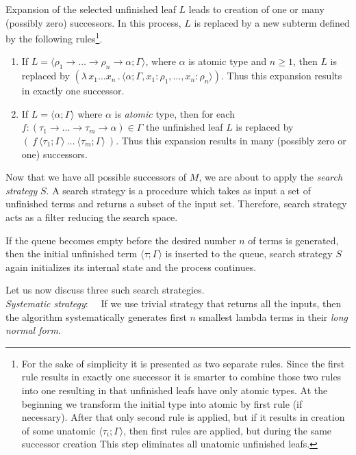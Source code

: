 \documentclass[conference]{IEEEtran}
\newcommand{\Lets}{Let us\xspace}
\newcommand{\lamb}[2]{( \lambda \, #1 \, . \, #2 )}
\newcommand{\ar}{\rightarrow\xspace}
\newcommand{\ul}[2]{\langle #1 ; #2 \rangle}
\begin{document}
Expansion of the selected unfinished leaf $L$ leads to creation of 
one or many (possibly zero) successors.
In this process, $L$ is replaced
by a new subterm defined by the following rules\footnote{
For the sake of simplicity it is presented as two separate rules. 
Since the first rule results in exactly one successor it is smarter
to combine those two rules into one resulting in that unfinished leafs
have only atomic types. At the beginning we transform the initial type into atomic by first rule (if necessary). After that
only second rule is applied, but if it results in creation of some unatomic 
$\ul{\tau_i}{\Gamma}$, then first rules are applied, but during the same successor creation This step eliminates all unatomic unfinished leafs. }.
\begin{enumerate}
 \item If $L = \ul{\rho_1 \ar \dots \ar \rho_n \ar \alpha}{\Gamma}$,
 	   where $\alpha$ is atomic type and $n \geq 1$, 
       then $L$ is replaced by 
       $\lamb{x_1 \dots x_n}{\ul{\alpha}
       {\Gamma,x_1 \colon \rho_1,\dots,x_n \colon \rho_n}}$.
       Thus this expansion results in exactly one successor.  
 \item If $L = \ul{\alpha}{\Gamma}$ where $\alpha$ is \textit{atomic} type,
       then for each 
       \mbox{$f : (\tau_1 \ar \dots \ar \tau_m \ar \alpha) \in \Gamma$}
       the unfinished leaf $L$ is replaced by 
       $(~f~\ul{\tau_1}{\Gamma}~\dots~\ul{\tau_m}{\Gamma}~)$.
       Thus this expansion results in many (possibly zero or one) successors.
\end{enumerate}

Now that we have all possible successors of $M$, we are about to apply
the \textit{search strategy} $S$. A search strategy is a procedure
which takes as input a set of unfinished terms and returns a subset
of the input set. Therefore, search strategy acts as a filter reducing 
the search space. 

If the queue becomes empty before the desired number $n$ of terms
is generated, then the initial unfinished term $\ul{\tau}{\Gamma}$ 
is inserted to the queue, search strategy $S$
again initializes its internal state and the process continues.

\Lets now discuss three such search strategies.\\

\textit{Systematic strategy}:~~ 
If we use trivial strategy that returns all the inputs, 
then the algorithm systematically generates 
first $n$ smallest lambda terms in their
\textit{long normal form}.\\
\end{document}
